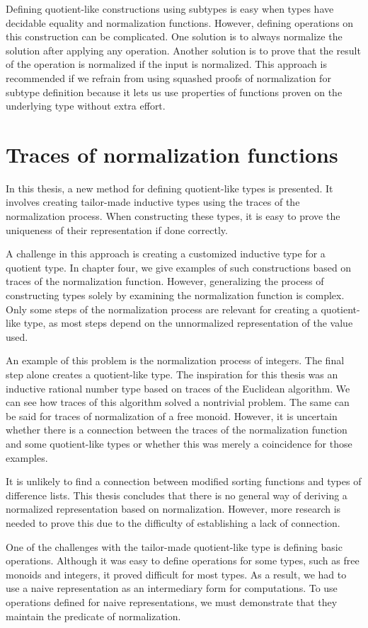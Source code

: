 Defining quotient-like constructions using subtypes is easy when types have decidable equality and normalization functions. However, defining operations on this construction can be complicated. One solution is to always normalize the solution after applying any operation. Another solution is to prove that the result of the operation is normalized if the input is normalized. This approach is recommended if we refrain from using squashed proofs of normalization for subtype definition because it lets us use properties of functions proven on the underlying type without extra effort.
\section{Traces of normalization functions}
In this thesis, a new method for defining quotient-like types is presented. It involves creating tailor-made inductive types using the traces of the normalization process. When constructing these types, it is easy to prove the uniqueness of their representation if done correctly.

A challenge in this approach is creating a customized inductive type for a quotient type. In chapter four, we give examples of such constructions based on traces of the normalization function. However, generalizing the process of constructing types solely by examining the normalization function is complex. Only some steps of the normalization process are relevant for creating a quotient-like type, as most steps depend on the unnormalized representation of the value used.

An example of this problem is the normalization process of integers. The final step alone creates a quotient-like type. The inspiration for this thesis was an inductive rational number type based on traces of the Euclidean algorithm. We can see how traces of this algorithm solved a nontrivial problem. The same can be said for traces of normalization of a free monoid. However, it is uncertain whether there is a connection between the traces of the normalization function and some quotient-like types or whether this was merely a coincidence for those examples.

It is unlikely to find a connection between modified sorting functions and types of difference lists. This thesis concludes that there is no general way of deriving a normalized representation based on normalization. However, more research is needed to prove this due to the difficulty of establishing a lack of connection.

One of the challenges with the tailor-made quotient-like type is defining basic operations. Although it was easy to define operations for some types, such as free monoids and integers, it proved difficult for most types. As a result, we had to use a naive representation as an intermediary form for computations. To use operations defined for naive representations, we must demonstrate that they maintain the predicate of normalization.
